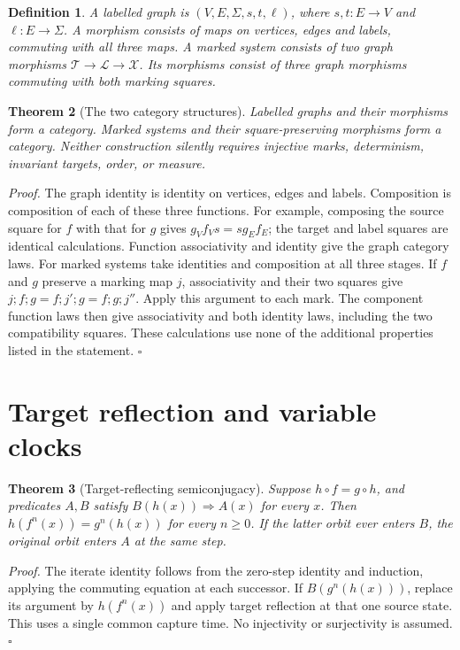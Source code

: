 \documentclass[11pt,letterpaper]{article}
\newtheorem{theorem}{Theorem}
\newtheorem{definition}[theorem]{Definition}
\newenvironment{proof}{\noindent\textit{Proof.}}{\hfill\(\square\)}
\begin{document}
\begin{definition}
A labelled graph is \((V,E,\Sigma,s,t,\ell)\), where \(s,t:E\to V\) and
\(\ell:E\to\Sigma\). A morphism consists of maps on vertices, edges and labels,
commuting with all three maps. A marked system consists of two graph morphisms
\(\mathcal T\to\mathcal L\to\mathcal X\). Its morphisms consist of three graph
morphisms commuting with both marking squares.
\end{definition}

\begin{theorem}[The two category structures]
Labelled graphs and their morphisms form a category. Marked systems and their
square-preserving morphisms form a category. Neither construction silently
requires injective marks, determinism, invariant targets, order, or measure.
\end{theorem}
\begin{proof}
The graph identity is identity on vertices, edges and labels. Composition is
composition of each of these three functions. For example, composing the source
square for \(f\) with that for \(g\) gives
\(g_Vf_Vs=s g_Ef_E\); the target and label squares are identical calculations.
Function associativity and identity give the graph category laws.
For marked systems take identities and composition at all three stages.
If \(f\) and \(g\) preserve a marking map \(j\), associativity and their two
squares give \(j;f;g=f;j';g=f;g;j''\). Apply this argument to each mark.
The component function laws then give associativity and both identity laws,
including the two compatibility squares. These calculations use none of the
additional properties listed in the statement.
\end{proof}

\section{Target reflection and variable clocks}

\begin{theorem}[Target-reflecting semiconjugacy]
Suppose \(h\circ f=g\circ h\), and predicates \(A,B\) satisfy
\(B(h(x))\Rightarrow A(x)\) for every \(x\).
Then \(h(f^n(x))=g^n(h(x))\) for every \(n\ge0\). If the latter orbit ever enters
\(B\), the original orbit enters \(A\) at the same step.
\end{theorem}
\begin{proof}
The iterate identity follows from the zero-step identity and induction, applying
the commuting equation at each successor. If \(B(g^n(h(x)))\), replace its
argument by \(h(f^n(x))\) and apply target reflection at that one source state.
This uses a single common capture time. No injectivity or surjectivity is assumed.
\end{proof}
\end{document}
